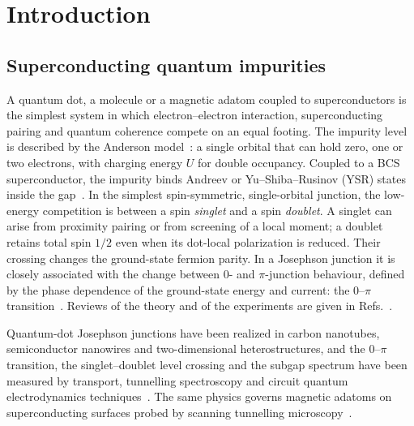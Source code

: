 \chapter{Introduction}\label{ch:introduction}

\section{Superconducting quantum impurities}

A quantum dot, a molecule or a magnetic adatom coupled to superconductors is the
simplest system in which electron--electron interaction, superconducting pairing and
quantum coherence compete on an equal footing. The impurity level is described by the
Anderson model~\cite{anderson1961localized}: a single orbital that can hold zero, one or
two electrons, with charging energy $U$ for double occupancy. Coupled to a BCS
superconductor, the impurity binds Andreev or Yu--Shiba--Rusinov (YSR) states inside the
gap~\cite{yu1965bound,shiba1968classical,rusinov1969superconductivity,balatsky2006impurity}.
In the simplest spin-symmetric, single-orbital junction, the low-energy competition
is between a spin \emph{singlet} and a spin \emph{doublet}. A singlet can arise from
proximity pairing or from screening of a local moment; a doublet retains total
spin $1/2$ even when its dot-local polarization is reduced. Their crossing changes
the ground-state fermion parity. In a Josephson junction it is closely associated
with the change between 0- and $\pi$-junction behaviour, defined by the phase dependence
of the ground-state energy and current: the 0--$\pi$
transition~\cite{glazman1989resonant,spivak1991negative,rozhkov1999josephson,vecino2003josephson,choi2004kondo,siano2004josephson,bauer2007spectral,karrasch2008josephson,meng2009selfconsistent}.
Reviews of the theory and of the experiments are given in
Refs.~\cite{defranceschi2010hybrid,martinrodero2011josephson,meden2019andersonjosephson,prada2020andreev}.

Quantum-dot Josephson junctions have been realized in carbon nanotubes, semiconductor
nanowires and two-dimensional heterostructures, and the 0--$\pi$ transition, the
singlet--doublet level crossing and the subgap spectrum have been measured by transport,
tunnelling spectroscopy and circuit quantum electrodynamics
techniques~\cite{vandam2006supercurrent,cleuziou2006carbon,pillet2010andreev,deacon2010tunneling,lee2014spinresolved,delagrange2015manipulating,bargerbos2022singletdoublet}.
The same physics governs magnetic adatoms on superconducting surfaces probed by scanning
tunnelling microscopy~\cite{yazdani1997probing,franke2011competition,ruby2015tunneling,heinrich2018single}.

